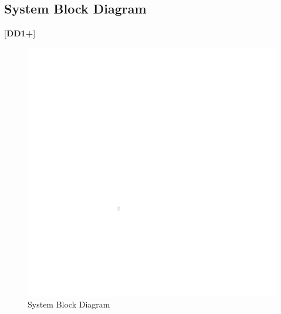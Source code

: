 \documentclass[letterpaper, 11pt]{article}
\begin{document}
\subsection{System Block Diagram}
[\textbf{DD1+}]
\begin{figure}[h]
    \centering
    \includegraphics[width=16cm]{images/white.png} %
    \caption{System Block Diagram}
\end{figure}

\clearpage
\end{document}
